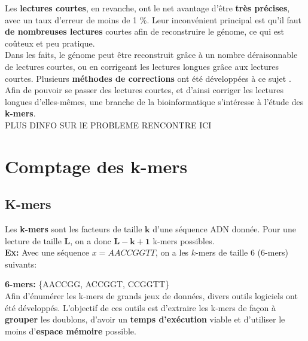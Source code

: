 \documentclass{report}
\begin{document}
      Les \textbf{lectures courtes}, en revanche, ont le net avantage d'être \textbf{très précises}, avec un taux d'erreur de moins de 1 \%. Leur inconvénient principal est qu'il faut \textbf{de nombreuses lectures} courtes afin de reconstruire le génome, ce qui est coûteux et peu pratique.\\

      Dans les faits, le génome peut être reconstruit grâce à un nombre déraisonnable de lectures courtes, ou en corrigeant les lectures longues grâce aux lectures courtes. Plusieurs \textbf{méthodes de corrections} ont été développées à ce sujet \cite{Morisse2017}.\\

      Afin de pouvoir se passer des lectures courtes, et d'ainsi corriger les lectures longues d'elles-mêmes, une branche de la bioinformatique s'intéresse à l'étude des \textbf{k-mers}.\\
      PLUS DINFO SUR lE PROBLEME RENCONTRE ICI
    \newpage
  \chapter{Comptage des k-mers}
    \section{K-mers}
      Les \textbf{k-mers} sont les facteurs de taille $\mathbf{k}$ d'une séquence ADN donnée. Pour une lecture de taille $\mathbf{L}$, on a donc $\mathbf{L - k + 1}$ k-mers possibles.\\
      \textbf{Ex:} Avec une séquence $x = AACCGGTT$, on a les $k$-mers de taille $6$ ($6$-mers) suivants:\\
      \begin{center}\end{center}
      \textbf{6-mers:} \{AACCGG, ACCGGT, CCGGTT\}\\
      Afin d'énumérer les k-mers de grands jeux de données, divers outils logiciels ont été développés. L'objectif de ces outils est d'extraire les k-mers de façon à \textbf{grouper} les doublons, d'avoir un \textbf{temps d'exécution} viable et d'utiliser le moins d'\textbf{espace mémoire} possible.\\
\end{document}
